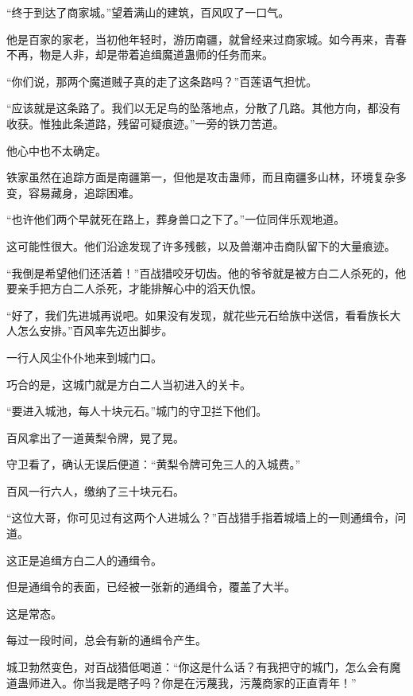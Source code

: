 
\begin{this_body}



“终于到达了商家城。”望着满山的建筑，百风叹了一口气。

他是百家的家老，当初他年轻时，游历南疆，就曾经来过商家城。如今再来，青春不再，物是人非，却是带着追缉魔道蛊师的任务而来。

“你们说，那两个魔道贼子真的走了这条路吗？”百莲语气担忧。

“应该就是这条路了。我们以无足鸟的坠落地点，分散了几路。其他方向，都没有收获。惟独此条道路，残留可疑痕迹。”一旁的铁刀苦道。

他心中也不太确定。

铁家虽然在追踪方面是南疆第一，但他是攻击蛊师，而且南疆多山林，环境复杂多变，容易藏身，追踪困难。

“也许他们两个早就死在路上，葬身兽口之下了。”一位同伴乐观地道。

这可能性很大。他们沿途发现了许多残骸，以及兽潮冲击商队留下的大量痕迹。

“我倒是希望他们还活着！”百战猎咬牙切齿。他的爷爷就是被方白二人杀死的，他要亲手把方白二人杀死，才能排解心中的滔天仇恨。

“好了，我们先进城再说吧。如果没有发现，就花些元石给族中送信，看看族长大人怎么安排。”百风率先迈出脚步。

一行人风尘仆仆地来到城门口。

巧合的是，这城门就是方白二人当初进入的关卡。

“要进入城池，每人十块元石。”城门的守卫拦下他们。

百风拿出了一道黄梨令牌，晃了晃。

守卫看了，确认无误后便道：“黄梨令牌可免三人的入城费。”

百风一行六人，缴纳了三十块元石。

“这位大哥，你可见过有这两个人进城么？”百战猎手指着城墙上的一则通缉令，问道。

这正是追缉方白二人的通缉令。

但是通缉令的表面，已经被一张新的通缉令，覆盖了大半。

这是常态。

每过一段时间，总会有新的通缉令产生。

城卫勃然变色，对百战猎低喝道：“你这是什么话？有我把守的城门，怎么会有魔道蛊师进入。你当我是瞎子吗？你是在污蔑我，污蔑商家的正直青年！”


\end{this_body}
